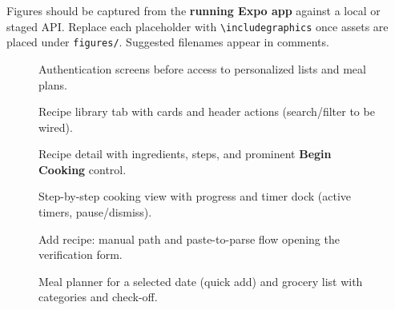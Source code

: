 Figures should be captured from the \textbf{running Expo app} against a local or staged API. Replace each placeholder with \verb|\includegraphics| once assets are placed under \texttt{figures/}. Suggested filenames appear in comments.

\begin{figure}[!htb]
\centering
\setlength{\fboxsep}{0pt}%
\caption{Authentication screens before access to personalized lists and meal plans.}
\label{fig:auth}
\end{figure}

\begin{figure}[!htb]
\centering
{}
\caption{Recipe library tab with cards and header actions (search/filter to be wired).}
\label{fig:home}
\end{figure}

\begin{figure}[!htb]
\centering
{}
\caption{Recipe detail with ingredients, steps, and prominent \textbf{Begin Cooking} control.}
\label{fig:detail}
\end{figure}

\begin{figure}[!htb]
\centering
{}
\caption{Step-by-step cooking view with progress and timer dock (active timers, pause/dismiss).}
\label{fig:cooking}
\end{figure}

\begin{figure}[!htb]
\centering
{}
\caption{Add recipe: manual path and paste-to-parse flow opening the verification form.}
\label{fig:add}
\end{figure}

\begin{figure}[!htb]
\centering
{}
\caption{Meal planner for a selected date (quick add) and grocery list with categories and check-off.}
\label{fig:planner}
\end{figure}

